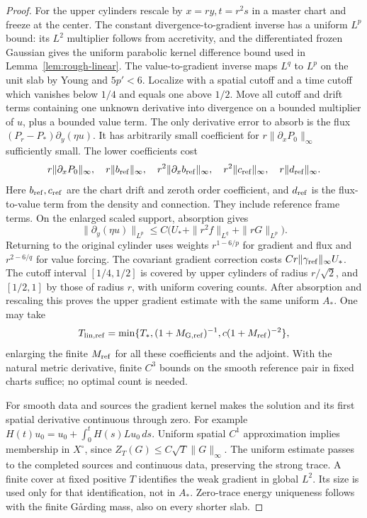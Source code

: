 \documentclass[11pt]{article}
\numberwithin{equation}{section}
\theoremstyle{definition}
\theoremstyle{remark}
\begin{document}
\begin{proof}
For the upper cylinders rescale by \(x=ry,t=r^2s\)
in a master chart and freeze at the center. The constant
divergence-to-gradient inverse has a uniform \(L^p\)
bound: its \(L^2\) multiplier follows from accretivity,
and the differentiated frozen Gaussian gives the uniform
parabolic kernel difference bound used in
Lemma~\ref{lem:rough-linear}. The value-to-gradient inverse
maps \(L^q\) to \(L^p\) on the unit slab by Young and
\(5p'<6\). Localize with a spatial cutoff and a time
cutoff which vanishes below \(1/4\) and equals one above
\(1/2\). Move all cutoff and drift terms containing one
unknown derivative into divergence on a bounded multiplier
of \(u\), plus a bounded value term. The only derivative
error to absorb is the flux
\((P_r-P_*)\partial_y(\eta u)\).
It has arbitrarily small coefficient for
\(r\|\partial_xP_0\|_\infty\) sufficiently small.
The lower coefficients cost
\[
 r\|\partial_xP_0\|_\infty,\quad
 r\|b_{\rm ref}\|_\infty,\quad
 r^2\|\partial_xb_{\rm ref}\|_\infty,\quad
 r^2\|c_{\rm ref}\|_\infty,\quad
 r\|d_{\rm ref}\|_\infty .
\]
Here \(b_{\rm ref},c_{\rm ref}\) are the chart drift and
zeroth order coefficient, and \(d_{\rm ref}\) is the
flux-to-value term from the density and connection.
They include reference frame terms.
On the enlarged scaled support, absorption gives
\[
 \|\partial_y(\eta u)\|_{L^p}
 \le C\bigl(U_*+\|r^2f\|_{L^q}+\|rG\|_{L^p}\bigr).
\]
Returning to the original cylinder uses weights
\(r^{1-6/p}\) for gradient and flux and \(r^{2-6/q}\)
for value forcing. The covariant gradient correction
costs \(Cr\|\gamma_{\rm ref}\|_\infty U_*\).
The cutoff interval \([1/4,1/2]\) is covered by
upper cylinders of radius \(r/\sqrt2\), and \([1/2,1]\)
by those of radius \(r\), with uniform covering counts.
After absorption and rescaling this proves the upper
gradient estimate with the same uniform \(A_*\).
One may take
\[
 T_{\rm lin,ref}
 =\min\{T_*,(1+M_{{\rm G},{\rm ref}})^{-1},
                   c(1+M_{\rm ref})^{-2}\},
\]
enlarging the finite \(M_{\rm ref}\) for all these
coefficients and the adjoint. With the natural metric
derivative, finite \(C^3\) bounds on the smooth reference
pair in fixed charts suffice; no optimal count is needed.

For smooth data and sources the gradient kernel makes
the solution and its first spatial derivative continuous
through zero. For example
\(H(t)u_0=u_0+\int_0^tH(s)Lu_0\,ds\).
Uniform spatial \(C^1\) approximation implies membership
in \(X^\circ\), since \(Z_T(G)\le C\sqrt T\|G\|_\infty\).
The uniform estimate passes to the completed sources
and continuous data, preserving the strong trace.
A finite cover at fixed positive \(T\) identifies the
weak gradient in global \(L^2\). Its size is used only
for that identification, not in \(A_*\).
Zero-trace energy uniqueness follows with the finite
Gårding mass, also on every shorter slab.


\end{proof}
\end{document}
